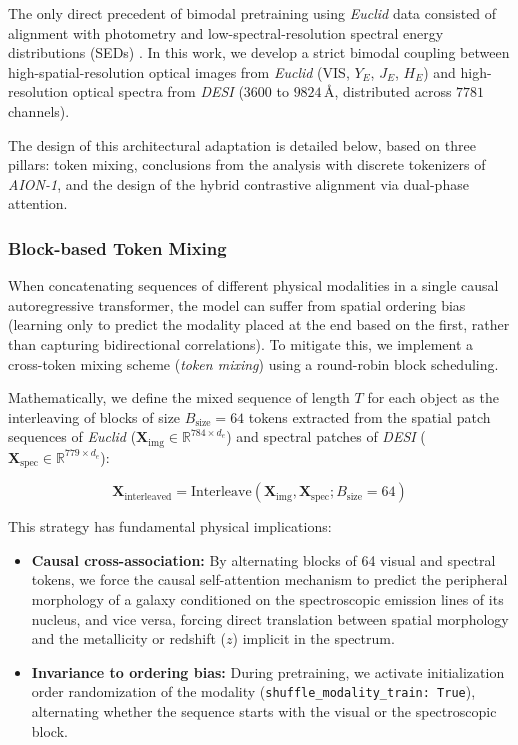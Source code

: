 The only direct precedent of bimodal pretraining using \textit{Euclid} data consisted of alignment with photometry and low-spectral-resolution spectral energy distributions (SEDs) \autocite{ar:siudek-2025}. In this work, we develop a strict bimodal coupling between high-spatial-resolution optical images from \textit{Euclid} (VIS, $Y_E$, $J_E$, $H_E$) and high-resolution optical spectra from \textit{DESI} ($3600$ to $9824\,\text{\AA{}}$, distributed across $7781$ channels).

The design of this architectural adaptation is detailed below, based on three pillars: token mixing, conclusions from the analysis with discrete tokenizers of \textit{AION-1}, and the design of the hybrid contrastive alignment via dual-phase attention.

\subsubsection{Block-based Token Mixing}

When concatenating sequences of different physical modalities in a single causal autoregressive transformer, the model can suffer from spatial ordering bias (learning only to predict the modality placed at the end based on the first, rather than capturing bidirectional correlations). To mitigate this, we implement a cross-token mixing scheme (\textit{token mixing}) using a round-robin block scheduling.

Mathematically, we define the mixed sequence of length $T$ for each object as the interleaving of blocks of size $B_{\text{size}} = 64$ tokens extracted from the spatial patch sequences of \textit{Euclid} ($\mathbf{X}_{\text{img}} \in \mathbb{R}^{784 \times d_e}$) and spectral patches of \textit{DESI} ($\mathbf{X}_{\text{spec}} \in \mathbb{R}^{779 \times d_e}$):

\begin{equation}
\mathbf{X}_{\text{interleaved}} = \text{Interleave}\left(\mathbf{X}_{\text{img}}, \mathbf{X}_{\text{spec}}; B_{\text{size}} = 64\right)
\label{eq:token_mixing}
\end{equation}

This strategy has fundamental physical implications:

\begin{itemize}
\item \textbf{Causal cross-association:} By alternating blocks of 64 visual and spectral tokens, we force the causal self-attention mechanism to predict the peripheral morphology of a galaxy conditioned on the spectroscopic emission lines of its nucleus, and vice versa, forcing direct translation between spatial morphology and the metallicity or redshift ($z$) implicit in the spectrum.
\item \textbf{Invariance to ordering bias:} During pretraining, we activate initialization order randomization of the modality (\texttt{shuffle\_modality\_train: True}), alternating whether the sequence starts with the visual or the spectroscopic block.
\end{itemize}

